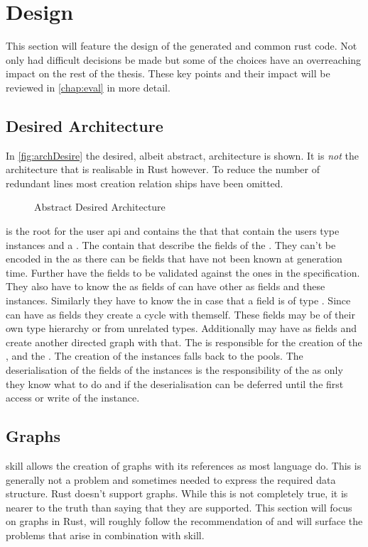 \documentclass[thesis]{subfiles}
\begin{document}
\chapter{Design}
This section will feature the design of the generated and common rust code.
Not only had difficult decisions be made but some of the choices have an overreaching impact on the rest of the thesis.
These key points and their impact will be reviewed in \autoref{chap:eval} in more detail.

\section{Desired Architecture}
  In \autoref{fig:archDesire} the desired, albeit abstract, architecture is shown.
  It is \emph{not} the architecture that is realisable in Rust however.
  To reduce the number of redundant lines most creation relation ships have been omitted.

  \begin{figure}[ht]
    \centering
    
    \caption{Abstract Desired Architecture}\label{fig:archDesire}
  \end{figure}

  \SkillFile is the root for the user \gls{api} and contains the \UserTypePools that that contain the users type instances and a \StringPool.
  The \UserTypePools contain \FieldDefinitions that describe the fields of the \UserType.
  They can't be encoded in the \UserTypePools as there can be fields that have not been known at generation time.
  Further have the fields to be validated against the ones in the specification.
  They also have to know the \UserTypePools as fields of \UserTypes can have other \UserTypes as fields and these instances.
  Similarly they have to know the \StringPool in case that a field is of type \String.
  Since \UserTypes can have \UserTypes as fields they create a cycle with themself.
  These fields may be of their own type hierarchy or from unrelated types.
  Additionally \UserTypes may have \Strings as fields and create another directed graph with that.
  The \FileReader is responsible for the creation of the \StringPool, \UserTypePools and the \FieldDeclarations.
  The creation of the instances falls back to the pools.
  The deserialisation of the fields of the instances is the responsibility of the \FieldDefinitions as only they know what to do and if the deserialisation can be deferred until the first access or write of the instance.

\section{Graphs}\label{sec:graph}
  \gls{skill} allows the creation of graphs with its references as most language do.
  This is generally not a problem and sometimes needed to express the required data structure.
  Rust doesn't support graphs.
  While this is not completely true, it is nearer to the truth than saying that they are supported.
  This section will focus on graphs in Rust, will roughly follow the recommendation of \autocite{rust-faq} and will surface the problems that arise in combination with \gls{skill}.
\end{document}
